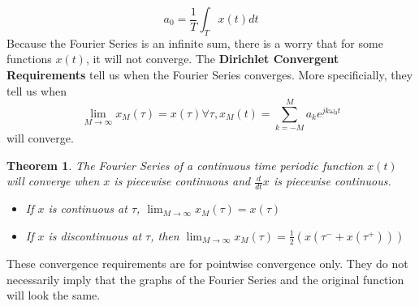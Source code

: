\documentclass{article}
\newtheorem{theorem}{Theorem}
\begin{document}
$$a_0 = \frac{1}{T}\int_{T}{x(t)dt}$$
Because the Fourier Series is an infinite sum, there is a worry that for some functions $x(t)$, it will not converge.
The \textbf{Dirichlet Convergent Requirements} tell us when the Fourier Series converges.
More specificially, they tell us when
$$\lim_{M \rightarrow \infty}{x_M(\tau) = x(\tau)} \forall \tau, x_M(t) = \sum_{k=-M}^{M}{a_k e^{jk\omega_0t}}$$
will converge.
\begin{theorem}
    The Fourier Series of a continuous time periodic function $x(t)$ will converge when
    $x$ is piecewise continuous and $\frac{d}{dt}x$ is piecewise continuous.
    \begin{itemize}
        \item If $x$ is continuous at $\tau$, $\lim_{M \rightarrow \infty}x_M(\tau) = x(\tau)$
        \item If $x$ is discontinuous at $\tau$, then $\lim_{M\rightarrow \infty}x_M(\tau) = \frac{1}{2}(x(\tau^- + x(\tau^+)))$ 
    \end{itemize}
\end{theorem}
These convergence requirements are for pointwise convergence only. They do not necessarily imply that the graphs of the Fourier Series
and the original function will look the same.
\end{document}
